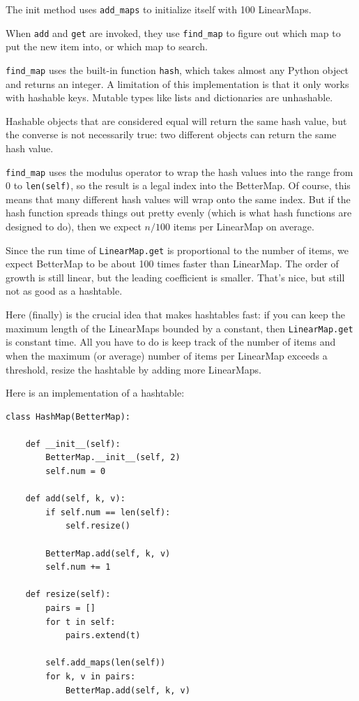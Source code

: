 \documentclass[10pt]{book}
\begin{document}
The init method uses \verb"add_maps" to initialize itself with
100 LinearMaps.

When {\tt add} and {\tt get} are invoked,
they use \verb"find_map" to figure out which map to put the
new item into, or which map to search.  

\verb"find_map" uses the built-in function {\tt hash}, which takes
almost any Python object and returns an integer.  A limitation of this
implementation is that it only works with hashable keys.  Mutable
types like lists and dictionaries are unhashable.

Hashable objects that are considered equal will return the same hash value,
but the converse is not necessarily true: two different objects
can return the same hash value.

\verb"find_map" uses the modulus operator to wrap the hash values
into the range from 0 to {\tt len(self)}, so the result is a legal
index into the BetterMap.  Of course, this means that many different
hash values will wrap onto the same index.  But if the hash function
spreads things out pretty evenly (which is what hash functions
are designed to do), then we expect $n/100$ items per LinearMap
on average. 

Since the run time of {\tt LinearMap.get} is proportional to the
number of items, we expect BetterMap to be about 100 times faster
than LinearMap.  The order of growth is still linear, but the
leading coefficient is smaller.  That's nice, but still not
as good as a hashtable.

Here (finally) is the crucial idea that makes hashtables fast:
if you can keep the maximum length of the LinearMaps bounded
by a constant, then {\tt LinearMap.get} is constant time.
All you have to do is keep track of the number of items and when
the maximum (or average) number of items per LinearMap exceeds
a threshold, resize the hashtable by adding more LinearMaps.

Here is an implementation of a hashtable:

\begin{verbatim}
class HashMap(BetterMap):

    def __init__(self):
        BetterMap.__init__(self, 2)
        self.num = 0

    def add(self, k, v):
        if self.num == len(self):
            self.resize()

        BetterMap.add(self, k, v)
        self.num += 1

    def resize(self):
        pairs = []
        for t in self:
            pairs.extend(t)

        self.add_maps(len(self))
        for k, v in pairs:
            BetterMap.add(self, k, v)
\end{verbatim}
\end{document}
